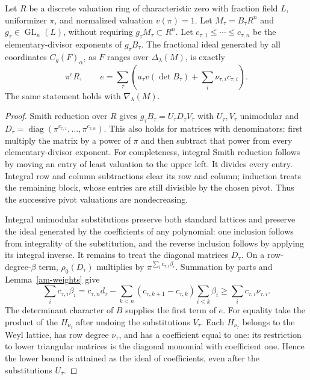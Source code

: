 \begin{theorem}\label{am-smith}
Let $R$ be a discrete valuation ring of characteristic zero with fraction
field $L$, uniformizer $\pi$, and normalized valuation $v(\pi)=1$.
Let $M_\tau=B_\tau R^n$ and $g_\tau\in\operatorname{GL}_n(L)$, without
requiring $g_\tau M_\tau\subset R^n$. Let
$c_{\tau,1}\le\cdots\le c_{\tau,n}$ be the elementary-divisor
exponents of $g_\tau B_\tau$. The fractional ideal generated by all
coordinates $C_g(F)_\alpha$, as $F$ ranges over
$\Delta_\lambda(M)$, is exactly
\begin{equation}\label{am-sharp-local}
 \pi^eR,\qquad
 e=\sum_\tau\left(a_\tau v(\det B_\tau)
                         +\sum_i\nu_{\tau,i}c_{\tau,i}\right).
\end{equation}
The same statement holds with $\nabla_\lambda(M)$.
\end{theorem}
\begin{proof}
Smith reduction over $R$ gives
$g_\tau B_\tau=U_\tau D_\tau V_\tau$ with $U_\tau,V_\tau$ unimodular
and $D_\tau=\operatorname{diag}(\pi^{c_{\tau,1}},\ldots,
\pi^{c_{\tau,n}})$. This also holds for matrices with denominators:
first multiply the matrix by a power of $\pi$ and then subtract that
power from every elementary-divisor exponent.
For completeness, integral Smith reduction follows by moving an entry
of least valuation to the upper left. It divides every entry. Integral
row and column subtractions clear its row and column; induction treats
the remaining block, whose entries are still divisible by the chosen
pivot. Thus the successive pivot valuations are nondecreasing.

Integral unimodular substitutions preserve both standard lattices and
preserve the ideal generated by the coefficients of any polynomial:
one inclusion follows from integrality of the substitution, and the
reverse inclusion follows by applying its integral inverse.
It remains to treat the diagonal matrices $D_\tau$.
On a row-degree-$\beta$ term, $\rho_0(D_\tau)$ multiplies by
$\pi^{\sum_i c_{\tau,i}\beta_i}$. Summation by parts and
Lemma~\ref{am-weights} give
\[
 \sum_i c_{\tau,i}\beta_i
 =c_{\tau,n}d_\tau
   -\sum_{k<n}(c_{\tau,k+1}-c_{\tau,k})\sum_{i\le k}\beta_i
 \ge\sum_i c_{\tau,i}\nu_{\tau,i}.
\]
The determinant character of $B$ supplies the first term of $e$.
For equality take the product of the $H_{\nu_\tau}$ after undoing
the substitutions $V_\tau$. Each $H_{\nu_\tau}$ belongs to the Weyl
lattice, has row degree $\nu_\tau$, and has a coefficient equal to one:
its restriction to lower triangular matrices is the diagonal monomial
with coefficient one. Hence the lower bound is attained as the ideal
of coefficients, even after the substitutions $U_\tau$.
\end{proof}

